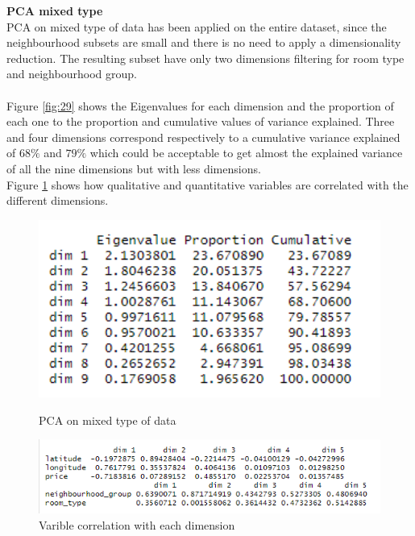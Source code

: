 \documentclass{FR16}
\begin{document}
\textbf{PCA mixed type}\\
PCA on mixed type of data has been applied on the entire dataset, since the neighbourhood subsets are small and there is no need to apply a dimensionality reduction. The resulting subset have only two dimensions filtering for room type and neighbourhood group. 
\\\\
Figure \ref{fig:29} shows the Eigenvalues for each dimension and the proportion of each one to the proportion and cumulative values of variance explained. Three and four dimensions correspond respectively to a cumulative variance explained of $68\%$ and $79\%$ which could be acceptable to get almost the explained variance of all the nine dimensions but with less dimensions. 
\\
Figure \ref{fig:30} shows how qualitative and quantitative variables are correlated with the different dimensions.
\begin{figure}[!htb]
   \begin{minipage}{0.48\textwidth}
     \centering
    \includegraphics[width=1\textwidth]{figures/pcamix.PNG} 
 \caption{\label{fig:29} PCA on mixed type of data}
   \end{minipage}\hfill
   \begin{minipage}{0.48\textwidth}
     \centering
       \includegraphics[width=1\textwidth]{figures/pcamix2.PNG} 
 \caption{\label{fig:30} Varible correlation with each dimension }
   \end{minipage}
   
\end{figure}
\end{document}
